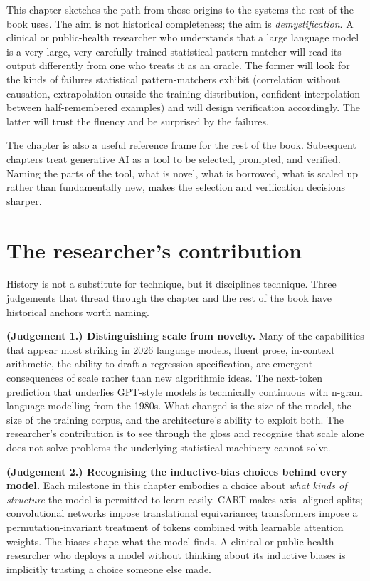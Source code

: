\documentclass[
  letterpaper,
  11pt]{scrbook}
\begin{document}
This chapter sketches the path from those origins to the systems the
rest of the book uses. The aim is not historical completeness; the aim
is \emph{demystification}. A clinical or public-health researcher who
understands that a large language model is a very large, very carefully
trained statistical pattern-matcher will read its output differently
from one who treats it as an oracle. The former will look for the kinds
of failures statistical pattern-matchers exhibit (correlation without
causation, extrapolation outside the training distribution, confident
interpolation between half-remembered examples) and will design
verification accordingly. The latter will trust the fluency and be
surprised by the failures.

The chapter is also a useful reference frame for the rest of the book.
Subsequent chapters treat generative AI as a tool to be selected,
prompted, and verified. Naming the parts of the tool, what is novel,
what is borrowed, what is scaled up rather than fundamentally new, makes
the selection and verification decisions sharper.

\section{The researcher's contribution}\label{sec-genesis-human}

History is not a substitute for technique, but it disciplines technique.
Three judgements that thread through the chapter and the rest of the
book have historical anchors worth naming.

\textbf{(Judgement 1.) Distinguishing scale from novelty.} Many of the
capabilities that appear most striking in 2026 language models, fluent
prose, in-context arithmetic, the ability to draft a regression
specification, are emergent consequences of scale rather than new
algorithmic ideas. The next-token prediction that underlies GPT-style
models is technically continuous with n-gram language modelling from the
1980s. What changed is the size of the model, the size of the training
corpus, and the architecture's ability to exploit both. The researcher's
contribution is to see through the gloss and recognise that scale alone
does not solve problems the underlying statistical machinery cannot
solve.

\textbf{(Judgement 2.) Recognising the inductive-bias choices behind
every model.} Each milestone in this chapter embodies a choice about
\emph{what kinds of structure} the model is permitted to learn easily.
CART makes axis- aligned splits; convolutional networks impose
translational equivariance; transformers impose a permutation-invariant
treatment of tokens combined with learnable attention weights. The
biases shape what the model finds. A clinical or public-health
researcher who deploys a model without thinking about its inductive
biases is implicitly trusting a choice someone else made.
\end{document}
